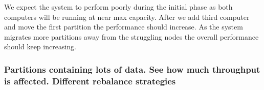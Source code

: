 We expect the system to perform poorly during the initial phase as both computers will be running at near max capacity. After we add third computer and move the first partition the performance should increase. As the system migrates more partitions away from the struggling nodes the overall performance should keep increasing. 

\subsubsection{Partitions containing lots of data. See how much throughput is affected. Different rebalance strategies}














